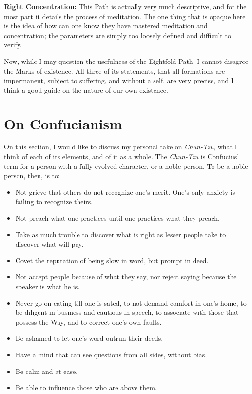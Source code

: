 \documentclass[12pt,letterpaper]{article}
\begin{document}
\begin{spacing}{2}
    \textbf{Right Concentration:} This Path is actually very much descriptive,
    and for the most part it details the process of meditation. The one thing
    that is opaque here is the idea of how can one know they have mastered
    meditation and concentration; the parameters are simply too loosely defined
    and difficult to verify.

    Now, while I may question the usefulness of the Eightfold Path, I cannot
    disagree the Marks of existence. All three of its statements, that all
    formations are impermanent, subject to suffering, and without a self, are
    very precise, and I think a good guide on the nature of our own existence.
    \newpage
    \section{On Confucianism}
    On this section, I would like to discuss my personal take on
    \emph{Chun-Tzu}, what I think of each of its elements, and of it as a
    whole. The \emph{Chun-Tzu} is Confucius' term for a person with a fully
    evolved character, or a noble person. To be a noble person, then, is to:
    \begin{itemize}
        \item Not grieve that others do not recognize one's merit. One's only
            anxiety is failing to recognize theirs.
        \item Not preach what one practices until one practices what they
            preach.
        \item Take as much trouble to discover what is right as lesser people
            take to discover what will pay.
        \item Covet the reputation of being slow in word, but prompt in deed.
        \item Not accept people because of what they say, nor reject saying
            because the speaker is what he is.
        \item Never go on eating till one is sated, to not demand comfort in
            one's home, to be diligent in business and cautious in speech, to
            associate with those that possess the Way, and to correct one's own
            faults.
        \item Be ashamed to let one's word outrun their deeds.
        \item Have a mind that can see questions from all sides, without bias.
        \item Be calm and at ease.
        \item Be able to influence those who are above them.

\end{itemize}
\end{spacing}
\end{document}
